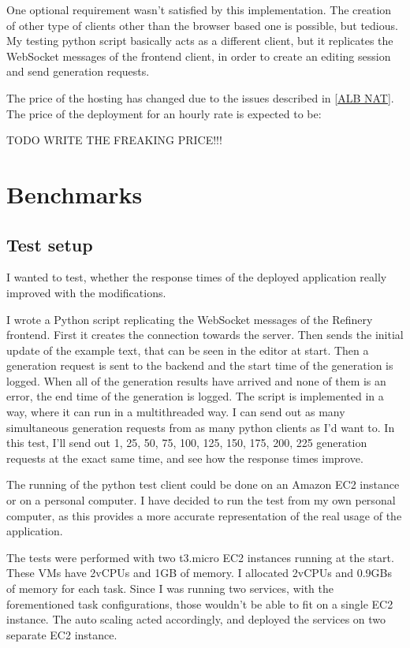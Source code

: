 	One optional requirement wasn't satisfied by this implementation. The creation of other type of clients other than the browser
	based one is possible, but tedious. My testing python script basically acts as a different client, but it replicates the WebSocket
	messages of the frontend client, in order to create an editing session and send generation requests.

	The price of the hosting has changed due to the issues described in \ref{ALB NAT}. The price of the deployment for an hourly rate 
	is expected to be:

	TODO WRITE THE FREAKING PRICE!!!

	\section{Benchmarks}
		\subsection{Test setup}
		I wanted to test, whether the response times of the deployed application really improved with the modifications.

		I wrote a Python script replicating the WebSocket messages of the Refinery frontend. First it creates the connection
		towards the server. Then sends the initial update
		of the example text, that can be seen in the editor at start. Then a generation request is sent to the backend and the start time of the generation
		is logged. When all of the generation results have arrived and none of them is an error, the end time of the generation is logged. 
		The script is implemented in a way, where it can run in a multithreaded way. I can send out as many simultaneous generation requests 
		from as many python clients as I'd want to. In this test, I'll send out 1, 25, 50, 75, 100, 125, 150, 175, 200, 225 generation requests
		at the exact same time, and see how the response times improve.

		The running of the python test client could be done on an Amazon EC2 instance or on a personal computer. I have decided to run the test 
		from my own personal computer, as this provides a more accurate representation of the real usage of the application.

		The tests were performed with two t3.micro EC2 instances running at the start. These VMs have 2vCPUs and 1GB of memory. I allocated
		2vCPUs and 0.9GBs of memory for each task. Since I was running two services, with the forementioned task configurations, 
		those wouldn't be able to fit on a single EC2 instance. The auto scaling acted accordingly, and deployed the services on two 
		separate EC2 instance. 

